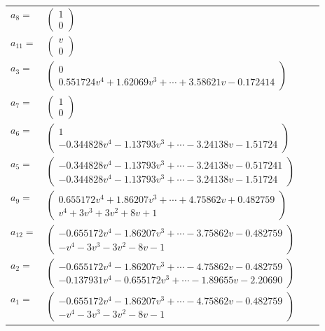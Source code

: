 \documentclass[1p]{elsarticle_modified}
\theoremstyle{definition}
\begin{document}
\begin{tabular}{m{7pt} m{180pt} m{7pt} m{180pt} }
\flushright $a_{8}=$&$\begin{pmatrix}1\\0\end{pmatrix}$ \\
\flushright $a_{11}=$&$\begin{pmatrix}v\\0\end{pmatrix}$ \\
\flushright $a_{3}=$&$\begin{pmatrix}0\\0.551724 v^{4}+1.62069 v^{3}+\cdots+3.58621 v-0.172414\end{pmatrix}$ \\
\flushright $a_{7}=$&$\begin{pmatrix}1\\0\end{pmatrix}$ \\
\flushright $a_{6}=$&$\begin{pmatrix}1\\-0.344828 v^{4}-1.13793 v^{3}+\cdots-3.24138 v-1.51724\end{pmatrix}$ \\
\flushright $a_{5}=$&$\begin{pmatrix}-0.344828 v^{4}-1.13793 v^{3}+\cdots-3.24138 v-0.517241\\-0.344828 v^{4}-1.13793 v^{3}+\cdots-3.24138 v-1.51724\end{pmatrix}$ \\
\flushright $a_{9}=$&$\begin{pmatrix}0.655172 v^{4}+1.86207 v^{3}+\cdots+4.75862 v+0.482759\\v^4+3 v^3+3 v^2+8 v+1\end{pmatrix}$ \\
\flushright $a_{12}=$&$\begin{pmatrix}-0.655172 v^{4}-1.86207 v^{3}+\cdots-3.75862 v-0.482759\\- v^4-3 v^3-3 v^2-8 v-1\end{pmatrix}$ \\
\flushright $a_{2}=$&$\begin{pmatrix}-0.655172 v^{4}-1.86207 v^{3}+\cdots-4.75862 v-0.482759\\-0.137931 v^{4}-0.655172 v^{3}+\cdots-1.89655 v-2.20690\end{pmatrix}$ \\
\flushright $a_{1}=$&$\begin{pmatrix}-0.655172 v^{4}-1.86207 v^{3}+\cdots-4.75862 v-0.482759\\- v^4-3 v^3-3 v^2-8 v-1\end{pmatrix}$ \\

\end{tabular}
\end{document}
